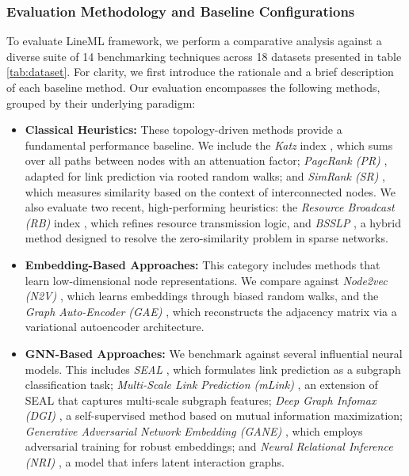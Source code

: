 \documentclass[pdflatex,sn-mathphys-num]{sn-jnl}%
\theoremstyle{thmstyleone}%
\theoremstyle{thmstyletwo}%
\theoremstyle{thmstylethree}%
\theoremstyle{plain} %
\theoremstyle{definition} %
\theoremstyle{remark} %
\theoremstyle{plain} %
\begin{document}
\subsubsection{Evaluation Methodology and Baseline Configurations}
\label{subsub:Basline}
To evaluate LineML framework, we perform a comparative analysis against a diverse suite of 14 benchmarking techniques across 18 datasets presented in table \ref{tab:dataset}. 
For clarity, we first introduce the rationale and a brief description of each baseline method.
Our evaluation encompasses the following methods, grouped by their underlying paradigm:
\begin{itemize}
    \item \textbf{Classical Heuristics:} These topology-driven methods provide a fundamental performance baseline. 
    We include the \textit{Katz} index \cite{24katz1953new}, which sums over all paths between nodes with an attenuation factor; 
    \textit{PageRank (PR)} \cite{25brin2012reprint}, adapted for link prediction via rooted random walks; and 
    \textit{SimRank (SR)} \cite{26jeh2002simrank}, which measures similarity based on the context of interconnected nodes. 
    We also evaluate two recent, high-performing heuristics: 
    the \textit{Resource Broadcast (RB)} index \cite{liu2024rb}, which refines resource transmission logic, and 
    \textit{BSSLP} \cite{liu2025bsslp}, a hybrid method designed to resolve the zero-similarity problem in sparse networks.
  
    \item \textbf{Embedding-Based Approaches:} This category includes methods that learn low-dimensional node representations. 
    We compare against \textit{Node2vec (N2V)} \cite{40grover2016node2vec}, which learns embeddings through biased random walks, and the \textit{Graph Auto-Encoder (GAE)} \cite{31kipf2016variational}, which reconstructs the adjacency matrix via a variational autoencoder architecture.
    
    \item \textbf{GNN-Based Approaches:} We benchmark against several influential neural models. 
    This includes \textit{SEAL} \cite{14zhang2018link}, which formulates link prediction as a subgraph classification task;
    \textit{Multi-Scale Link Prediction (mLink)} \cite{33cai2020multi}, an extension of SEAL that captures multi-scale subgraph features; 
    \textit{Deep Graph Infomax (DGI)} \cite{velickovic2018deep}, 
    a self-supervised method based on mutual information maximization; 
    \textit{Generative Adversarial Network Embedding (GANE)} \cite{hong2020gane}, which employs adversarial training for robust embeddings; and \textit{Neural Relational Inference (NRI)} \cite{41kipf2018neural}, a model that infers latent interaction graphs.
    

\end{itemize}
\end{document}
